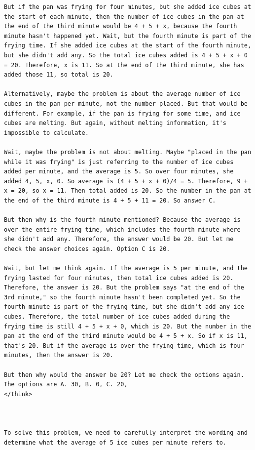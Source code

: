 \documentclass{article}
\theoremstyle{plain}
\theoremstyle{definition}
\theoremstyle{remark}
\begin{document}
\begin{lstlisting}
But if the pan was frying for four minutes, but she added ice cubes at the start of each minute, then the number of ice cubes in the pan at the end of the third minute would be 4 + 5 + x, because the fourth minute hasn't happened yet. Wait, but the fourth minute is part of the frying time. If she added ice cubes at the start of the fourth minute, but she didn't add any. So the total ice cubes added is 4 + 5 + x + 0 = 20. Therefore, x is 11. So at the end of the third minute, she has added those 11, so total is 20.

Alternatively, maybe the problem is about the average number of ice cubes in the pan per minute, not the number placed. But that would be different. For example, if the pan is frying for some time, and ice cubes are melting. But again, without melting information, it's impossible to calculate.

Wait, maybe the problem is not about melting. Maybe "placed in the pan while it was frying" is just referring to the number of ice cubes added per minute, and the average is 5. So over four minutes, she added 4, 5, x, 0. So average is (4 + 5 + x + 0)/4 = 5. Therefore, 9 + x = 20, so x = 11. Then total added is 20. So the number in the pan at the end of the third minute is 4 + 5 + 11 = 20. So answer C.

But then why is the fourth minute mentioned? Because the average is over the entire frying time, which includes the fourth minute where she didn't add any. Therefore, the answer would be 20. But let me check the answer choices again. Option C is 20.

Wait, but let me think again. If the average is 5 per minute, and the frying lasted for four minutes, then total ice cubes added is 20. Therefore, the answer is 20. But the problem says "at the end of the 3rd minute," so the fourth minute hasn't been completed yet. So the fourth minute is part of the frying time, but she didn't add any ice cubes. Therefore, the total number of ice cubes added during the frying time is still 4 + 5 + x + 0, which is 20. But the number in the pan at the end of the third minute would be 4 + 5 + x. So if x is 11, that's 20. But if the average is over the frying time, which is four minutes, then the answer is 20.

But then why would the answer be 20? Let me check the options again. The options are A. 30, B. 0, C. 20,
</think>



To solve this problem, we need to carefully interpret the wording and determine what the average of 5 ice cubes per minute refers to.


\end{lstlisting}
\end{document}
